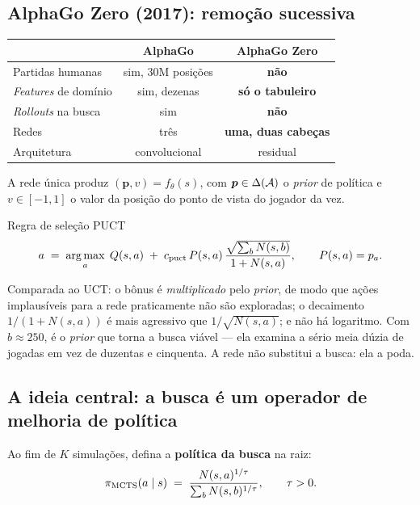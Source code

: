 \documentclass[a4paper, 11pt]{article}
\newcommand{\Nv}[1]{N(#1)}
\begin{document}
\subsection{AlphaGo Zero (2017): remoção sucessiva}

\begin{center}
{\small
\begin{tabular}{@{}lcc@{}}
  \toprule
  & \textbf{AlphaGo} & \textbf{AlphaGo Zero} \\
  \midrule
  Partidas humanas            & sim, 30M posições & \color{rlVerde!70!black}\bfseries não \\
  \emph{Features} de domínio  & sim, dezenas      & \color{rlVerde!70!black}\bfseries só o tabuleiro \\
  \emph{Rollouts} na busca    & sim               & \color{rlVerde!70!black}\bfseries não \\
  Redes                       & três              & \color{rlVerde!70!black}\bfseries uma, duas cabeças \\
  Arquitetura                 & convolucional     & residual \\
  \bottomrule
\end{tabular}}
\end{center}

A rede única produz $(\bm{p}, v) = f_\theta(s)$, com $\bm{p}\in\Delta(\mathcal{A})$ o
\emph{prior} de política e $v\in[-1,1]$ o valor da posição do ponto de vista do
jogador da vez.

\begin{teobox}{Regra de seleção PUCT}
\[
  a \;=\; \argmax_{a}\; Q(s,a) \;+\; c_{\text{puct}}\, P(s,a)\,
  \frac{\sqrt{\sum_b \Nv{s,b}}}{1+\Nv{s,a}},
  \qquad P(s,a) = p_a .
\]
\end{teobox}

Comparada ao UCT: o bônus é \emph{multiplicado} pelo \emph{prior}, de modo que
ações implausíveis para a rede praticamente não são exploradas; o decaimento
$1/(1+\Nv{s,a})$ é mais agressivo que $1/\sqrt{\Nv{s,a}}$; e não há logaritmo.
Com $b\approx250$, é o \emph{prior} que torna a busca viável --- ela examina a
sério meia dúzia de jogadas em vez de duzentas e cinquenta. A rede não substitui
a busca: ela a poda.

\subsection{A ideia central: a busca é um operador de melhoria de política}

Ao fim de $K$ simulações, defina a \textbf{política da busca} na raiz:
\[
  \pol_{\text{MCTS}}(a\mid s) \;=\;
  \frac{\Nv{s,a}^{1/\tau}}{\sum_b \Nv{s,b}^{1/\tau}}, \qquad \tau>0 .
\]
\end{document}
